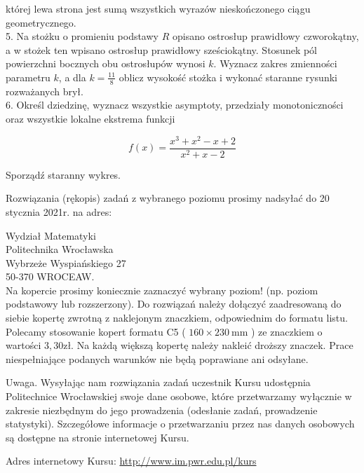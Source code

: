 \documentclass[10pt]{article}
\begin{document}
której lewa strona jest sumą wszystkich wyrazów nieskończonego ciągu geometrycznego.\\
5. Na stożku o promieniu podstawy $R$ opisano ostrosłup prawidłowy czworokątny, a w stożek ten wpisano ostrosłup prawidłowy sześciokątny. Stosunek pól powierzchni bocznych obu ostrosłupów wynosi $k$. Wyznacz zakres zmienności parametru $k$, a dla $k=\frac{11}{8}$ oblicz wysokość stożka i wykonać staranne rysunki rozważanych brył.\\
6. Określ dziedzinę, wyznacz wszystkie asymptoty, przedziały monotoniczności oraz wszystkie lokalne ekstrema funkcji

$$
f(x)=\frac{x^{3}+x^{2}-x+2}{x^{2}+x-2}
$$

Sporządź staranny wykres.

Rozwiązania (rękopis) zadań z wybranego poziomu prosimy nadsyłać do 20 stycznia 2021r. na adres:

Wydział Matematyki\\
Politechnika Wrocławska\\
Wybrzeże Wyspiańskiego 27\\
50-370 WROCEAW.\\
Na kopercie prosimy koniecznie zaznaczyć wybrany poziom! (np. poziom podstawowy lub rozszerzony). Do rozwiązań należy dołączyć zaadresowaną do siebie kopertę zwrotną z naklejonym znaczkiem, odpowiednim do formatu listu. Polecamy stosowanie kopert formatu C5 ( $160 \times 230 \mathrm{~mm}$ ) ze znaczkiem o wartości $3,30 \mathrm{zł}$. Na każdą większą kopertę należy nakleić droższy znaczek. Prace niespełniające podanych warunków nie będą poprawiane ani odsyłane.

Uwaga. Wysyłając nam rozwiązania zadań uczestnik Kursu udostępnia Politechnice Wrocławskiej swoje dane osobowe, które przetwarzamy wyłącznie w zakresie niezbędnym do jego prowadzenia (odesłanie zadań, prowadzenie statystyki). Szczegółowe informacje o przetwarzaniu przez nas danych osobowych są dostępne na stronie internetowej Kursu.

Adres internetowy Kursu: \href{http://www.im.pwr.edu.pl/kurs}{http://www.im.pwr.edu.pl/kurs}
\end{document}
